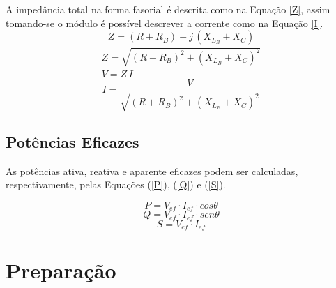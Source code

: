 \documentclass[a4paper,12pt,oneside,openany,table,xcdraw]{article}
\begin{document}
A impedância total na forma fasorial é descrita como na Equação \ref{Z}, assim tomando-se o módulo é possível descrever a corrente como na Equação \ref{I}.
\begin{equation}\label{Z}
\dot{Z}=(R+R_{B}) + j\, (X_{L_{B}}+ X_{C})
\end{equation}
\begin{gather*}
Z = \sqrt{(R+R_{B})^2 + (X_{L_{B}}+ X_{C})^2 } \\
V = Z\, I
\end{gather*}
\begin{equation}\label{I}
I = \dfrac{V}{\sqrt{(R+R_{B})^2 + (X_{L_{B}}+ X_{C})^2 }}
\end{equation}

\subsection{Potências Eficazes}
As potências ativa, reativa e aparente eficazes podem ser calculadas, respectivamente, pelas Equações (\ref{P}), (\ref{Q}) e (\ref{S}). 

\begin{equation}\label{P}
P=V_{ef}\cdot I_{ef}\cdot cos\theta
\end{equation}
\begin{equation}\label{Q}
Q=V_{ef}\cdot I_{ef}\cdot sen\theta
\end{equation}
\begin{equation}\label{S}
S=V_{ef}\cdot I_{ef}
\end{equation}

\section{Preparação}
\end{document}
